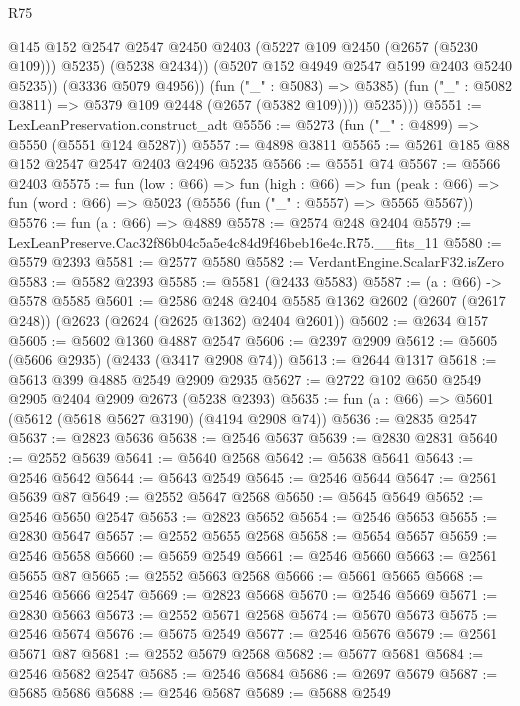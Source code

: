 \begin{lexlean}{R75}
\begin{coremodule}
                    @145
                    @152
                    @2547
                    @2547
                    @2450
                    @2403
                    (@5227 @109 @2450 (@2657 (@5230 @109)))
                    @5235)
                  (@5238 @2434))
                (@5207 @152 @4949 @2547 @5199 @2403 @5240 @5235))
              (@3336 @5079 @4956))
            (fun ("_" : @5083) => @5385)
            (fun ("_" : @5082 @3811) => @5379 @109 @2448 (@2657 (@5382 @109))))
          @5235)))
@5551 := LexLeanPreservation.construct_adt
@5556 := @5273 (fun ("_" : @4899) => @5550 (@5551 @124 @5287))
@5557 := @4898 @3811
@5565 := @5261 @185 @88 @152 @2547 @2547 @2403 @2496 @5235
@5566 := @5551 @74
@5567 := @5566 @2403
@5575 := fun (low : @66) =>
  fun (high : @66) =>
  fun (peak : @66) => fun (word : @66) => @5023 (@5556 (fun ("_" : @5557) => @5565 @5567))
@5576 := fun (a : @66) => @4889
@5578 := @2574 @248 @2404
@5579 := LexLeanPreserve.Cac32f86b04c5a5e4c84d9f46beb16e4c.R75.__fits_11
@5580 := @5579 @2393
@5581 := @2577 @5580
@5582 := VerdantEngine.ScalarF32.isZero
@5583 := @5582 @2393
@5585 := @5581 (@2433 @5583)
@5587 := (a : @66) -> @5578 @5585
@5601 := @2586
    @248
    @2404
    @5585
    @1362
    @2602
    (@2607 (@2617 @248))
    (@2623 (@2624 (@2625 @1362) @2404 @2601))
@5602 := @2634 @157
@5605 := @5602 @1360 @4887 @2547
@5606 := @2397 @2909
@5612 := @5605 (@5606 @2935) (@2433 (@3417 @2908 @74))
@5613 := @2644 @1317
@5618 := @5613 @399 @4885 @2549 @2909 @2935
@5627 := @2722 @102 @650 @2549 @2905 @2404 @2909 @2673 (@5238 @2393)
@5635 := fun (a : @66) => @5601 (@5612 (@5618 @5627 @3190) (@4194 @2908 @74))
@5636 := @2835 @2547
@5637 := @2823 @5636
@5638 := @2546 @5637
@5639 := @2830 @2831
@5640 := @2552 @5639
@5641 := @5640 @2568
@5642 := @5638 @5641
@5643 := @2546 @5642
@5644 := @5643 @2549
@5645 := @2546 @5644
@5647 := @2561 @5639 @87
@5649 := @2552 @5647 @2568
@5650 := @5645 @5649
@5652 := @2546 @5650 @2547
@5653 := @2823 @5652
@5654 := @2546 @5653
@5655 := @2830 @5647
@5657 := @2552 @5655 @2568
@5658 := @5654 @5657
@5659 := @2546 @5658
@5660 := @5659 @2549
@5661 := @2546 @5660
@5663 := @2561 @5655 @87
@5665 := @2552 @5663 @2568
@5666 := @5661 @5665
@5668 := @2546 @5666 @2547
@5669 := @2823 @5668
@5670 := @2546 @5669
@5671 := @2830 @5663
@5673 := @2552 @5671 @2568
@5674 := @5670 @5673
@5675 := @2546 @5674
@5676 := @5675 @2549
@5677 := @2546 @5676
@5679 := @2561 @5671 @87
@5681 := @2552 @5679 @2568
@5682 := @5677 @5681
@5684 := @2546 @5682 @2547
@5685 := @2546 @5684
@5686 := @2697 @5679
@5687 := @5685 @5686
@5688 := @2546 @5687
@5689 := @5688 @2549

\end{coremodule}
\end{lexlean}
